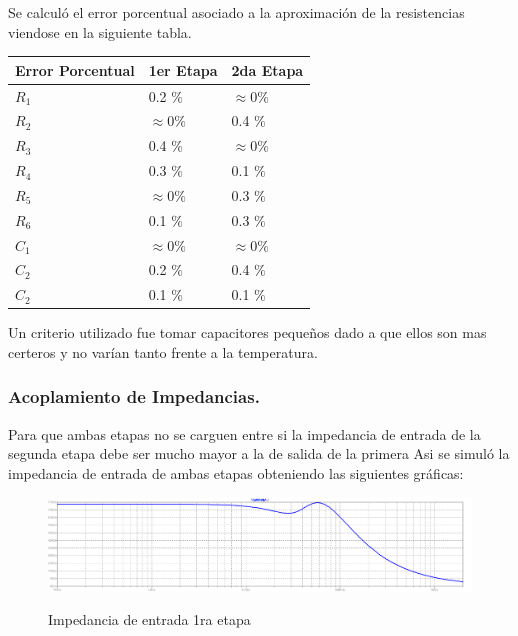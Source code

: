 Se calculó el error porcentual asociado a la aproximación de la resistencias viendose en la siguiente tabla.
\begin{table}[H]
\centering
\begin{tabular}{lll}
\multicolumn{1}{c}{Error Porcentual} & \multicolumn{1}{c}{1er Etapa} & \multicolumn{1}{c}{2da Etapa} \\ \hline
$R_1$                                & 0.2 $\%$                      & $\approx 0 \%$                \\
$R_2$                                & $\approx 0 \%$                & 0.4 $\%$                      \\
$R_3$                                & 0.4 $\%$                      & $\approx 0 \%$                \\
$R_4$                                & 0.3 $\%$                      & 0.1 $\%$                      \\
$R_5$                                & $\approx 0 \%$                & 0.3 $\%$                      \\
$R_6$                                & 0.1 $\%$                      & 0.3 $\%$                      \\
$C_1$                                & $\approx 0 \%$                & $\approx 0 \%$                \\
$C_2$                                & 0.2 $\%$                      & 0.4 $\%$                      \\
$C_2$                                & 0.1 $\%$                      & 0.1 $\%$                     
\end{tabular}
\end{table}

Un criterio utilizado fue tomar capacitores pequeños dado a que ellos son mas certeros y no varían tanto frente a la temperatura.  

\subsubsection{Acoplamiento de Impedancias.}
Para que ambas etapas no se carguen entre si la impedancia de entrada de la segunda etapa debe ser mucho mayor a la de salida de la primera
Asi se simuló la impedancia de entrada de ambas etapas obteniendo las siguientes gráficas:
\begin{figure}[H]
	\centering
	\includegraphics[width=\textwidth]{Imagenes-Ej3/ZinE1.png}
	\label{fig:stepresponse}
	\caption{Impedancia de entrada 1ra etapa}
\end{figure}


